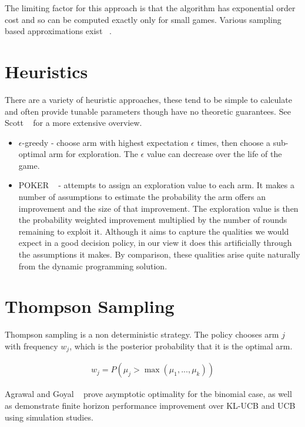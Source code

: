 \documentclass[11pt,a4,singlespacing,titlepagenumber=on]{scrreprt}
\numberwithin{equation}{chapter} %
\theoremstyle{remark}
\begin{document}
The limiting factor for this approach is that the algorithm has exponential order cost and so can be computed exactly only for small games. Various sampling based approximations exist ~\cite{guez2012efficient}.

\section{ Heuristics } \label{sec:heuristics}

There are a variety of heuristic approaches, these tend to be simple to calculate and often provide tunable parameters though have no theoretic guarantees. See Scott ~\cite{scott2010modern} for a more extensive overview.

\begin{itemize}
	\item $\epsilon$-greedy - choose arm with highest expectation $\epsilon$ times, then choose a sub-optimal arm for exploration. The $\epsilon$ value can decrease over the life of the game.
	\item POKER ~\cite{vermorel2005multi} - attempts to assign an exploration value to each arm. It makes a number of assumptions to estimate the probability the arm offers an improvement and the size of that improvement. The exploration value is then the probability weighted improvement multiplied by the number of rounds remaining to exploit it. Although it aims to capture the qualities we would expect in a good decision policy, in our view it does this artificially through the assumptions it makes. By comparison, these qualities arise quite naturally from the dynamic programming solution.
\end{itemize}

\section{ Thompson Sampling }

Thompson sampling is a non deterministic strategy. The policy chooses arm $j$ with frequency $w_j$, which is the posterior probability that it is the optimal arm.

\begin{align}
w_j = P(\mu_j > \max(\mu_1, ..., \mu_k))
\end{align}

Agrawal and Goyal ~\cite{DBLP:journals/corr/abs-1111-1797} prove asymptotic optimality for the binomial case, as well as demonstrate finite horizon performance improvement over KL-UCB and UCB using simulation studies.
\end{document}
